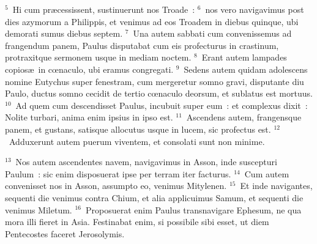 ${}^{5}$~Hi cum pr\ae cessissent, sustinuerunt nos Troade~:
${}^{6}$~nos vero navigavimus post dies azymorum a Philippis, et venimus ad eos Troadem in diebus quinque, ubi demorati sumus diebus septem.
${}^{7}$~Una autem sabbati cum convenissemus ad frangendum panem, Paulus disputabat cum eis profecturus in crastinum, protraxitque sermonem usque in mediam noctem.
${}^{8}$~Erant autem lampades copios\ae\ in cœnaculo, ubi eramus congregati.
${}^{9}$~Sedens autem quidam adolescens nomine Eutychus super fenestram, cum mergeretur somno gravi, disputante diu Paulo, ductus somno cecidit de tertio cœnaculo deorsum, et sublatus est mortuus.
${}^{10}$~Ad quem cum descendisset Paulus, incubuit super eum~: et complexus dixit~: Nolite turbari, anima enim ipsius in ipso est.
${}^{11}$~Ascendens autem, frangensque panem, et gustans, satisque allocutus usque in lucem, sic profectus est.
${}^{12}$~Adduxerunt autem puerum viventem, et consolati sunt non minime.


${}^{13}$~Nos autem ascendentes navem, navigavimus in Asson, inde suscepturi Paulum~: sic enim disposuerat ipse per terram iter facturus.
${}^{14}$~Cum autem convenisset nos in Asson, assumpto eo, venimus Mitylenen.
${}^{15}$~Et inde navigantes, sequenti die venimus contra Chium, et alia applicuimus Samum, et sequenti die venimus Miletum.
${}^{16}$~Proposuerat enim Paulus transnavigare Ephesum, ne qua mora illi fieret in Asia. Festinabat enim, si possibile sibi esset, ut diem Pentecostes faceret Jerosolymis.


